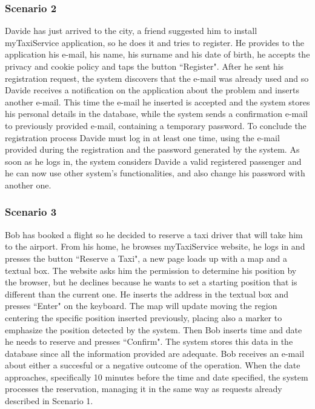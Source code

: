 \documentclass[a4paper,12pt]{article}%
\newcounter{func_req_counter}
\begin{document}
\subsubsection{Scenario 2}
Davide has just arrived to the city, a friend suggested him to install myTaxiService application, so he does it and tries to register.
He provides to the application his e-mail, his name, his surname and his date of birth, he accepts the privacy and cookie policy and taps the button ``Register". After he sent his registration request, the system discovers that the e-mail was already used and so Davide receives a notification on the application about the problem and inserts another e-mail.
This time the e-mail he inserted is accepted and the system stores his personal details in the database, while the system sends a confirmation e-mail to previously provided e-mail, containing a temporary password.
To conclude the registration process Davide must log in at least one time, using the e-mail provided during the registration and the password generated by the system.
As soon as he logs in, the system considers Davide a valid registered passenger and he can now use other system's functionalities, and also change his password with another one.  
\subsubsection{Scenario 3}
Bob has booked a flight so he decided to reserve a taxi driver that will take him to the airport.
From his home, he browses myTaxiService website, he logs in and presses the button ``Reserve a Taxi", a new page loads up with a map and a textual box.
The website asks him the permission to determine his position by the browser, but he declines because he wants to set a starting position that is different than the current one.
He inserts the address in the textual box and presses ``Enter" on the keyboard. The map will update moving the region centering the specific position inserted previously, placing also a marker to emphasize the position detected by the system.
Then Bob inserts time and date he needs to reserve and presses ``Confirm".
The system stores this data in the database since all the information provided are adequate. Bob receives an e-mail about either a succesful or a negative outcome of the operation.
When the date approaches, specifically 10 minutes before the time and date specified, the system processes the reservation, managing it in the same way as requests already described in Scenario 1. 
\end{document}
